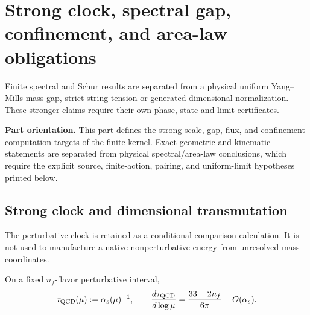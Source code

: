 \documentclass[12pt,a4paper]{article}
\begin{document}



\section{Strong clock, spectral gap, confinement, and area-law obligations}
\label{p10:sec:v237-a4}
Finite spectral and Schur results are separated from a physical uniform Yang--Mills mass gap, strict string tension or generated dimensional normalization. These stronger claims require their own phase, state and limit certificates.

\label{p10:part:strong-clock-gap-confinement}

\noindent\textbf{Part orientation.}
This part defines the strong-scale, gap, flux, and confinement computation targets of the finite kernel.  Exact geometric and kinematic statements are separated from physical spectral/area-law conclusions, which require the explicit source, finite-action, pairing, and uniform-limit hypotheses printed below.


\subsection{Strong clock and dimensional transmutation}
\label{p10:sec:strong-clock}

The perturbative clock is retained as a conditional comparison calculation.  It is not used to manufacture a native nonperturbative energy from unresolved mass coordinates.

\begin{definition}
\label{p10:def:strong-inverse-clock}
On a fixed \(n_f\)-flavor perturbative interval,
\begin{equation}
\label{p10:eq:strong-inverse-clock}
\tau_{\rm QCD}(\mu):=\alpha_s(\mu)^{-1},\qquad
\frac{d\tau_{\rm QCD}}{d\log\mu}=\frac{33-2n_f}{6\pi}+O(\alpha_s).
\end{equation}
\end{definition}
\end{document}
